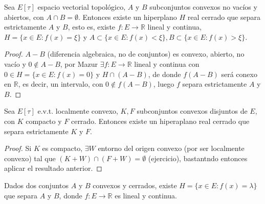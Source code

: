 \begin{corollary}
  Sea $E[\tau]$ espacio vectorial topológico, $A$ y $B$ subconjuntos convexos no
  vacíos y abiertos, con $A\cap B= \emptyset$. Entonces existe un hiperplano $H$ 
  real cerrado que separa estrictamente $A$ y $B$, esto es, existe $f:E\to
  \mathbb{R}$ lineal y continua, $H=\{x\in E:f(x)=\xi\} $ y $A\subset \{x\in
  E:f(x)<\xi\}, B\subset \{x\in E:f(x)>\xi\} $.
\end{corollary}

\begin{proof}
  $A-B$ (diferencia algebraica, no de conjuntos) es convexo, abierto, no vacío y
  $0\not\in A-B$, por Mazur $\exists f:E\to \mathbb{R}$ lineal y continua con
  $0\in H=\{x\in E:f(x)=0\} $ y $H\cap (A-B)$, de donde $f(A-B)$ será conexo en
  $\mathbb{R}$, es decir, un intervalo, con $0\not\in f(A-B)$, luego $f$ separa
  estrictamente $A$ y $B$.
\end{proof}

\begin{corollary}
  Sea $E[\tau]$ e.v.t. localmente convexo, $K,F$ subconjuntos convexos disjuntos
  de $E$, con $K$ compacto y $F$ cerrado. Entonces existe un hiperaplano real
  cerrado que separa estrictamente $K$ y $F$.
\end{corollary}

\begin{proof}
  Si $K$ es compacto, $\exists W$ entorno del origen convexo (por ser localmente
  convexo) tal que $(K+W)\cap (F+W)=\emptyset$ (ejercicio), bastantndo entonces
  aplicar el resultado anterior.
\end{proof}


\begin{theorem}
  \label{th:h-b-geom}
  Dados dos conjuntos $A$ y $B$ convexos y cerrados, existe $H=\{x\in
  E:f(x)=\lambda\} $ que separa $A$ y $B$, donde $f:E\to \mathbb{R}$ es lineal y
  continua.
\end{theorem}
